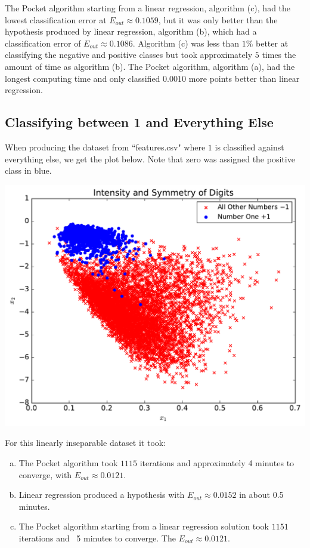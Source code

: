\documentclass[a4paper]{article}
\begin{document}
\begin{doublespace}
\newpage

The Pocket algorithm starting from a linear regression, algorithm (c), had the lowest classification error at $E_{out} \approx 0.1059$, but it was only better than the hypothesis produced by linear regression, algorithm (b), which had a classification error of $E_{out} \approx 0.1086$. Algorithm (c) was less than $1\%$ better at classifying the negative and positive classes but took approximately $5$ times the amount of time as algorithm (b). The Pocket algorithm, algorithm (a), had the longest computing time and only classified $0.0010$ more points better than linear regression.

\subsection{Classifying between 1 and Everything Else}

When producing the dataset from ``features.csv" where $1$ is classified against everything else, we get the plot below. Note that zero was assigned the positive class in blue.

\begin{center}
	\includegraphics[scale =0.65]{By_One/midterm_plot.pdf}
\end{center}

For this linearly inseparable dataset it took:

\begin{enumerate}[(a)]
\item The Pocket algorithm took $1115$ iterations and approximately 4 minutes to converge, with $E_{out} \approx 0.0121$.
\item Linear regression produced a hypothesis with $E_{out} \approx 0.0152$ in about 0.5 minutes.
\item The Pocket algorithm starting from a linear regression solution took $1151$ iterations and ~5 minutes to converge. The $E_{out} \approx 0.0121$.
\end{enumerate}


\end{doublespace}
\end{document}
